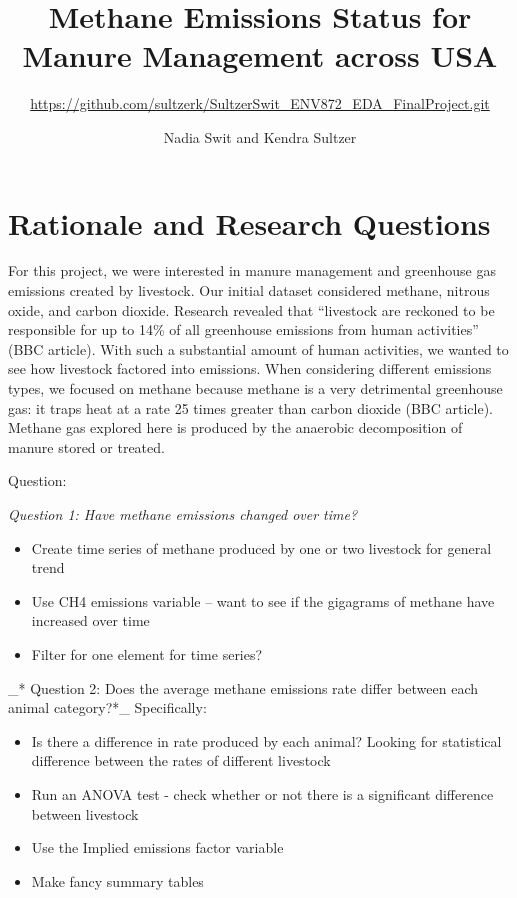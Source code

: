 \documentclass[
  12pt,
]{article}
\title{Methane Emissions Status for Manure Management across USA}
\subtitle{\url{https://github.com/sultzerk/SultzerSwit_ENV872_EDA_FinalProject.git}}
\author{Nadia Swit and Kendra Sultzer}
\date{}
\providecommand{\tightlist}{%
  \setlength{\itemsep}{0pt}\setlength{\parskip}{0pt}}
\begin{document}
\maketitle

\newpage
\tableofcontents 
\newpage
\listoftables 
\newpage
\listoffigures 
\newpage

\hypertarget{rationale-and-research-questions}{%
\section{Rationale and Research
Questions}\label{rationale-and-research-questions}}

For this project, we were interested in manure management and greenhouse
gas emissions created by livestock. Our initial dataset considered
methane, nitrous oxide, and carbon dioxide. Research revealed that
``livestock are reckoned to be responsible for up to 14\% of all
greenhouse emissions from human activities'' (BBC article). With such a
substantial amount of human activities, we wanted to see how livestock
factored into emissions. When considering different emissions types, we
focused on methane because methane is a very detrimental greenhouse gas:
it traps heat at a rate 25 times greater than carbon dioxide (BBC
article). Methane gas explored here is produced by the anaerobic
decomposition of manure stored or treated.

Question:

\emph{\emph{Question 1: Have methane emissions changed over time?}}

\begin{itemize}
\tightlist
\item
  Create time series of methane produced by one or two livestock for
  general trend
\item
  Use CH4 emissions variable -- want to see if the gigagrams of methane
  have increased over time
\item
  Filter for one element for time series?
\end{itemize}

\_* Question 2: Does the average methane emissions rate differ between
each animal category?*\_ Specifically:

\begin{itemize}
\tightlist
\item
  Is there a difference in rate produced by each animal? Looking for
  statistical difference between the rates of different livestock
\item
  Run an ANOVA test - check whether or not there is a significant
  difference between livestock
\item
  Use the Implied emissions factor variable
\item
  Make fancy summary tables
\end{itemize}
\end{document}
